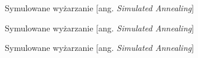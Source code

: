 \begin{frame}{Symulowane wyżarzanie [ang. \textit{Simulated Annealing}]}


\end{frame}

\begin{frame}{Symulowane wyżarzanie [ang. \textit{Simulated Annealing}]}
	

\end{frame}

\begin{frame}{Symulowane wyżarzanie [ang. \textit{Simulated Annealing}]}


\end{frame}

